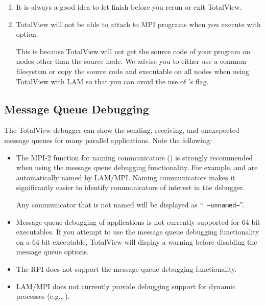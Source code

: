 \begin{enumerate}
\item It is always a good idea to let  finish before you
  rerun or exit TotalView.
  
\item TotalView will not be able to attach to MPI programs when you
  execute  with  option.  
  
  This is because TotalView will not get the source code of your
  program on nodes other than the source node.  We advise you to
  either use a common filesystem or copy the source code and
  executable on all nodes when using TotalView with LAM so that you
  can avoid the use of 's  flag.
\end{enumerate}


\subsection{Message Queue Debugging}

The TotalView debugger can show the sending, receiving, and
unexepected message queues for many parallel applications.  Note the
following:

\begin{itemize}
\item The MPI-2 function for naming communicators
  () is strongly recommended when
  using the message queue debugging functionality.  For example,
   and 
  are automatically named by LAM/MPI.  Naming communicators makes it
  significantly easier to identify communicators of interest in the
  debugger.

  Any communicator that is not named will be displayed as ``{\tt
  --unnamed--}''.

\item Message queue debugging of applications is not currently
  supported for 64 bit executables.  If you attempt to use the message
  queue debugging functionality on a 64 bit executable, TotalView will
  display a warning before disabling the message queue options.
  
\item The  RPI does not support the message queue debugging
  functionality.
  
\item LAM/MPI does not currently provide debugging support for dynamic
  processes (e.g., ).
\end{itemize}

